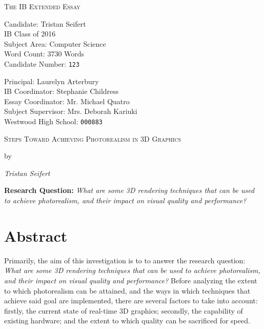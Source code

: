 \documentclass[11pt, oneside]{report}
\begin{document}
\begin{titlepage}
	{\centering\scshape\Huge The IB Extended Essay\par}
	\vspace{.66cm}
	
	\begin{minipage}[t]{0.4975\textwidth}
		Candidate: Tristan Seifert \\
		IB Class of 2016 \\
		Subject Area: Computer Science \\
		Word Count: 3730 Words \\
		Candidate Number: \tt{123}
	\end{minipage}
	\hfill
	\begin{minipage}[t]{0.4975\textwidth}
		\begin{flushright}
			Principal: Laurelyn Arterbury \\
			IB Coordinator: Stephanie Childress \\
			Essay Coordinator: Mr. Michael Quatro \\
			Subject Supervisor: Mrs. Deborah Kariuki \\
			Westwood High School: \tt{000883}
		\end{flushright}
	\end{minipage}

	\centering
	\vspace{8.2cm}
	{\scshape\Large Steps Toward Achieving Photorealism in 3D Graphics\par}
	{by\par}
	{\itshape Tristan Seifert\par}
	\vspace{8.2cm}
	{\bfseries Research Question:}
	{\textit{What are some 3D rendering techniques that can be used to achieve photorealism, and their impact on visual quality and performance?}}
	\vfill
\end{titlepage}

{
	\renewcommand{\addtocontents}[2]{}
	\chapter*{Abstract}
}

Primarily, the aim of this investigation is to to answer the research question: \textit{What are some 3D rendering techniques that can be used to achieve photorealism, and their impact on visual quality and performance?} Before analyzing the extent to which photorealism can be attained, and the ways in which techniques that achieve said goal are implemented, there are several factors to take into account: firstly, the current state of real-time 3D graphics; secondly, the capability of existing hardware; and the extent to which quality can be sacrificed for speed. 
\end{document}
